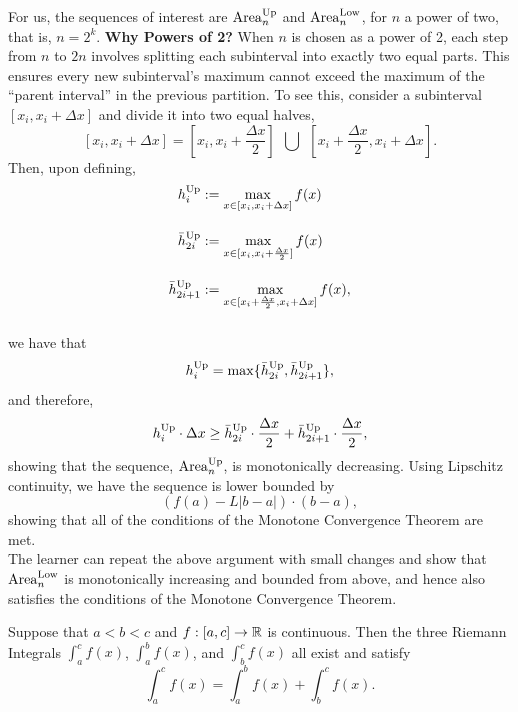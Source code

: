 For us, the sequences of interest are $ {\rm Area}^{\rm Up}_n$ and ${\rm Area}^{\rm Low}_n$, for $n$ a power of two, that is, $n=2^k$.  \textbf{Why Powers of 2?}  When \(n\) is chosen as a power of 2, each step from \(n\) to \(2n\) involves splitting each subinterval into exactly two equal parts. This ensures every new subinterval's maximum cannot exceed the maximum of the ``parent interval'' in the previous partition. To see this, consider a subinterval $[x_i, x_i + \Delta x]$ and divide it into two equal halves, 
$$ [x_i, x_i + \Delta x] = [x_i, x_i + \frac{\Delta x}{2}] ~~ \bigcup ~~ [ x_i + \frac{\Delta x}{2}, x_i + \Delta x]. $$
Then, upon defining, 
\begin{align*}
    h_i^{\rm Up}&:=\max_{x \in [x_i,  x_i + \Delta x]} f(x) \\[1em] 
    \bar{h}_{2i}^{\rm Up}&:=\max_{x \in [x_i, x_i + \frac{\Delta x}{2}]} f(x) \\[1em]
    \bar{h}_{2i+1}^{\rm Up}&:=\max_{x \in [ x_i + \frac{\Delta x}{2}, x_i + \Delta x]} f(x), \\[1em]
\end{align*}
we have that $$h_i^{\rm Up} = \max\{ \bar{h}_{2i}^{\rm Up}, \bar{h}_{2i+1}^{\rm Up} \},$$
and therefore, 
$$h_i^{\rm Up} \cdot  \Delta x \ge  \bar{h}_{2i}^{\rm Up} \cdot \frac{\Delta x}{2} + \bar{h}_{2i+1}^{\rm Up} \cdot \frac{\Delta x}{2},$$
showing that the sequence, ${\rm Area}^{\rm Up}_n$, is monotonically decreasing. Using Lipschitz continuity, we have the sequence is lower bounded by 
$$ \left(f(a) - L|b-a| \right)\cdot (b-a),$$
showing that all of the conditions of the Monotone Convergence Theorem are met.\\

The learner can repeat the above argument with small changes and show that ${\rm Area}^{\rm Low}_n$ is monotonically increasing and bounded from above, and hence also satisfies the conditions of the Monotone Convergence Theorem. 
\Qed

\bigskip


\begin{tcolorbox}[title=\textcolor{black}{Proof of Prop.~\ref{thm:FirstAdditivityProperty} (Additivity Property of the Riemann Integral)}, sharp corners, colback=green!30, colframe=green!80!blue, breakable, fonttitle=\bfseries]

Suppose that $a < b <c$ and $f:[a, c] \to \mathbb R$ is continuous. Then the three Riemann Integrals  $\int_{a}^{c} f(x)$, $\int_{a}^{b} f(x)$, and $\int_{b}^{c} f(x)$ all exist and satisfy
$$
\int_{a}^{c} f(x) =\int_{a}^{b} f(x) + \int_{b}^{c} f(x).
$$
\end{tcolorbox}


